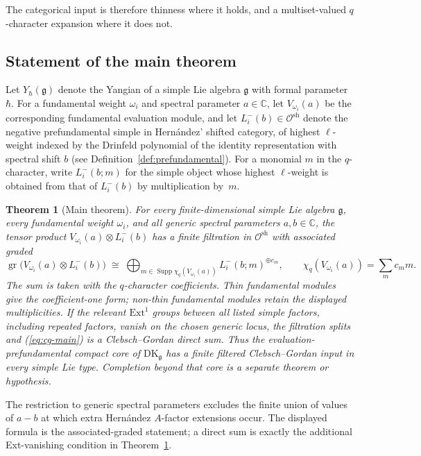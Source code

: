 \documentclass[11pt,reqno]{amsart}
\newtheorem{theorem}{Theorem}[section]
\theoremstyle{definition}
\theoremstyle{remark}
\newcommand{\cO}{\mathcal{O}}
\newcommand{\fg}{\mathfrak{g}}
\newcommand{\Ext}{\mathrm{Ext}}
\newcommand{\DK}{\mathrm{DK}}
\newcommand{\Yh}{Y_\hbar(\fg)}
\DeclareMathOperator{\gr}{gr}
\numberwithin{equation}{section}
\begin{document}
The categorical input is therefore thinness where it holds, and a
multiset-valued \(q\)-character expansion where it does not.

\subsection{Statement of the main theorem}

Let $\Yh$ denote the Yangian of a simple Lie algebra $\fg$ with
formal parameter $\hbar$. For a fundamental weight $\omega_i$ and
spectral parameter $a \in \mathbb{C}$, let $V_{\omega_i}(a)$ be the
corresponding fundamental evaluation module, and let
$L^-_i(b) \in \cO^{\mathrm{sh}}$ denote the negative prefundamental
simple in Hern\'andez' shifted category, of highest $\ell$-weight
indexed by the Drinfeld polynomial of the identity representation
with spectral shift $b$ (see Definition~\ref{def:prefundamental}).
For a monomial $m$ in the $q$-character, write
$L^-_i(b;m)$ for the simple object whose highest $\ell$-weight is
obtained from that of $L^-_i(b)$ by multiplication by~$m$.

\begin{theorem}[Main theorem]
\label{thm:main}
For every finite-dimensional simple Lie algebra $\fg$, every
fundamental weight $\omega_i$, and all generic spectral parameters
$a, b \in \mathbb{C}$, the tensor product
$V_{\omega_i}(a)\otimes L^-_i(b)$ has a finite filtration in
$\cO^{\mathrm{sh}}$ with associated graded
\begin{equation}\label{eq:cg-main}
\gr\bigl(V_{\omega_i}(a) \otimes L^-_i(b)\bigr)
 \;\cong\;
 \bigoplus_{m \in \operatorname{Supp}\chi_q(V_{\omega_i}(a))}
 L^-_i(b;m)^{\oplus c_m},
 \qquad
 \chi_q(V_{\omega_i}(a))=\sum_m c_m m .
\end{equation}
The sum is taken with the $q$-character coefficients. Thin
fundamental modules give the coefficient-one form; non-thin
fundamental modules retain the displayed multiplicities. If the
relevant $\Ext^1$ groups between all listed simple factors,
including repeated factors, vanish on the chosen generic locus,
the filtration splits and (\ref{eq:cg-main}) is a
Clebsch--Gordan direct sum. Thus the evaluation-prefundamental
compact core of $\DK_\fg$ has a finite filtered
Clebsch--Gordan input in every simple Lie type. Completion beyond
that core is a separate theorem or hypothesis.
\end{theorem}

The restriction to generic spectral parameters excludes the finite
union of values of $a-b$ at which extra Hern\'andez $A$-factor
extensions occur. The displayed formula is the associated-graded
statement; a direct sum is exactly the additional Ext-vanishing
condition in
Theorem~\ref{thm:main}.
\end{document}
